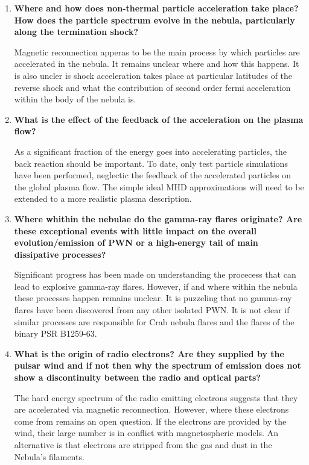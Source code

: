 \begin{enumerate}

\item \textbf{Where and how does non-thermal particle acceleration take place? How does the particle spectrum evolve in the nebula, particularly along the termination shock? }

Magnetic reconnection apperas to be the main process by which particles are accelerated in the nebula. It remains unclear where and how this happens. It is also uncler is shock acceleration takes place at particular latitudes of the reverse shock and what the contribution of second order fermi acceleration within the body of the nebula is.

\item \textbf{What is the effect of the feedback of the acceleration on the plasma flow?}

As a significant fraction of the energy goes into accelerating particles, the back reaction should be important. To date, only test particle simulations have been performed, neglectic the feedback of the accelerated particles on the global plasma flow. The simple ideal MHD approximations will need to be extended to a more realistic plasma description.

\item \textbf{Where whithin the nebulae do the gamma-ray flares originate? Are these exceptional events with little impact on the overall evolution/emission of PWN or a high-energy tail of main dissipative processes?  }

Significant progress has been made on understanding the procecess that can lead to explosive gamma-ray flares. However, if and where within the nebula these processes happen remains unclear. It is puzzeling that no gamma-ray flares have been discovered from any other isolated PWN. It is not clear if similar processes are responsible for Crab nebula flares and the flares of the binary PSR B1259-63.

\item \textbf{What is the origin of radio electrons? Are they supplied by the pulsar wind and if not then why the spectrum of emission does not show a discontinuity between the radio and optical parts? }

The hard energy spectrum of the radio emitting electrons suggests that they are accelerated via magnetic reconnection. However, where these electrons come from remains an open question. If the electrons are provided by the wind, their large number is in conflict with magnetospheric models. An alternative is that electrons are stripped from the gas and dust in the Nebula's filaments.


\end{enumerate}
